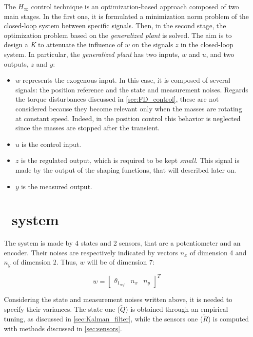 The ${H_{\infty}}$ control technique is an optimization-based approach composed of two main stages. In the first one, it is formulated a minimization norm problem of the closed-loop system between specific signals. Then, in the second stage, the optimization problem based on the \textit{generalized plant} is solved.
\newline
The aim is to design a \textit{K} to attenuate the influence of $w$ on the signals $z$ in the closed-loop system. In particular, the \textit{generalized plant} has two inputs, $w$ and $u$, and two outputs, $z$ and $y$:
\begin{itemize}
	\item \boldmath$w$ represents the exogenous input. In this case, it is composed of several signals: the position reference and the state and measurement noises. Regards the torque disturbances discussed in \cref{sec:FD_control}, these are not considered because they become relevant only when the masses are rotating at constant speed. Indeed, in the position control this behavior is neglected since the masses are stopped after the transient.
	\item \boldmath$u$ is the control input.
	\item \boldmath$z$ is the regulated output, which is required to be kept \textit{small}. This signal is made by the output of the shaping functions, that will described later on.
	\item \boldmath$y$ is the measured output.
\end{itemize}

\section{\onedof\ system}
The system is made by 4 states and 2 sensors, that are a potentiometer and an encoder. Their noises are respectively indicated by vectors $n_x$ of dimension 4 and $n_y$ of dimension 2. Thus, $w$ will be of dimension 7:

\begin{equation}
	w=
	\begin{bmatrix}
		\theta_{1_{ref}} & n_x & n_y
	\end{bmatrix}^{T}
\end{equation}

Considering the state and measurement noises written above, it is needed to specify their variances. The state one ($\tilde{Q}$) is obtained through an empirical tuning, as discussed in \cref{sec:Kalman_filter}, while the sensors one ($\tilde{R}$) is computed with methods discussed in \cref{sec:sensors}.

